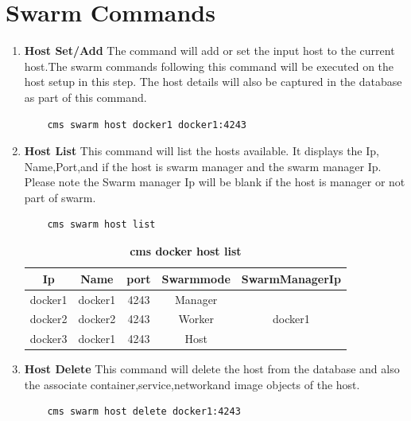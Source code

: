 \documentclass[9pt,twocolumn,twoside]{../../styles/osajnl}
\begin{document}
\section{Swarm Commands}
\begin{enumerate}
    \item \textbf{Host Set/Add}
     The command will add or set the input host to the current host.The swarm commands following this command will be executed on the host setup in this step. The host details will also be captured in the database as part of this command.\\
     
    \begin{verbatim}
    cms swarm host docker1 docker1:4243
    \end{verbatim} 

     
    \item \textbf{Host List}
     This command will list the hosts available. It displays the Ip, Name,Port,and if the host is swarm manager and the swarm manager Ip. Please note the Swarm manager Ip will be blank if the host is manager or not part of swarm.
     
    \begin{verbatim}
    cms swarm host list
    \end{verbatim} 

     \begin{table}[htbp]
     \caption{\bf cms docker host list }
     \begin{tabular}{ccccc}
     \hline
      Ip & Name & port & Swarmmode &SwarmManagerIp\\
      \hline
      docker1 & docker1 & 4243 & Manager & \\
      docker2 & docker2 & 4243 & Worker & docker1\\
      docker3 & docker1 & 4243 & Host & \\
     \hline
     \end{tabular}
     \label{tab:tab5}
     \end{table}
     
    \item \textbf{Host Delete}
    This command will delete the host from the database and also the associate container,service,networkand image objects of the host.\\

    \begin{verbatim}
    cms swarm host delete docker1:4243
    \end{verbatim} 
    

\end{enumerate}
\end{document}
